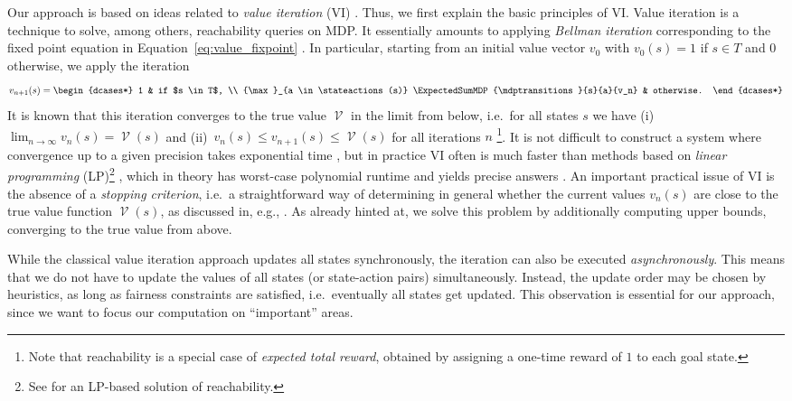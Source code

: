 \documentclass{theoretics}
\DeclareMathOperator{\val}{\mathcal{V}}
\newcommand{\targetset}{T}
\begin{document}
Our approach is based on ideas related to \emph{value iteration} (VI) \cite{howard1960dynamic}.
Thus, we first explain the basic principles of VI.
Value iteration is a technique to solve, among others, reachability queries on MDP.
It essentially amounts to applying \emph{Bellman iteration} \cite{bellman1966dynamic} corresponding to the fixed point equation in Equation~\eqref{eq:value_fixpoint} \cite[Section~4.2]{DBLP:conf/sfm/ForejtKNP11}.
In particular, starting from an initial value vector $v_0$ with $v_0(s) = 1$ if $s \in \targetset$ and $0$ otherwise, we apply the iteration
\begin{equation*}
	v_{n+1}(s) = \begin{dcases*}
		1 & if $s \in \targetset$, \\
		{\max}_{a \in \stateactions(s)} \ExpectedSumMDP{\mdptransitions}{s}{a}{v_n} & otherwise.
	\end{dcases*}
\end{equation*}
It is known that this iteration converges to the true value $\val$ in the limit from below, i.e.\ for all states $s$ we have (i)~$\lim_{n \to \infty} v_n(s) = \val(s)$ and (ii)~$v_n(s) \leq v_{n+1}(s) \leq \val(s)$ for all iterations $n$ \cite[Theorem~7.2.12]{DBLP:books/wi/Puterman94}\footnote{Note that reachability is a special case of \emph{expected total reward}, obtained by assigning a one-time reward of $1$ to each goal state.}.
It is not difficult to construct a system where convergence up to a given precision takes exponential time \cite{DBLP:conf/rp/HaddadM14}, but in practice VI often is much faster than methods based on \emph{linear programming} (LP)\footnote{See \cite[Theorem~10.105]{DBLP:books/daglib/0020348} for an LP-based solution of reachability.} \cite{DBLP:conf/tacas/HartmannsJQW23}, which in theory has worst-case polynomial runtime and yields precise answers \cite{DBLP:journals/combinatorica/Karmarkar84}.
An important practical issue of VI is the absence of a \emph{stopping criterion}, i.e.\ a straightforward way of determining in general whether the current values $v_n(s)$ are close to the true value function $\val(s)$, as discussed in, e.g., \cite[Section~4.2]{DBLP:conf/sfm/ForejtKNP11}.
As already hinted at, we solve this problem by additionally computing upper bounds, converging to the true value from above.

While the classical value iteration approach updates all states synchronously, the iteration can also be executed \emph{asynchronously}.
This means that we do not have to update the values of all states (or state-action pairs) simultaneously.
Instead, the update order may be chosen by heuristics, as long as fairness constraints are satisfied, i.e.\ eventually all states get updated.
This observation is essential for our approach, since we want to focus our computation on \enquote{important} areas.
\end{document}
